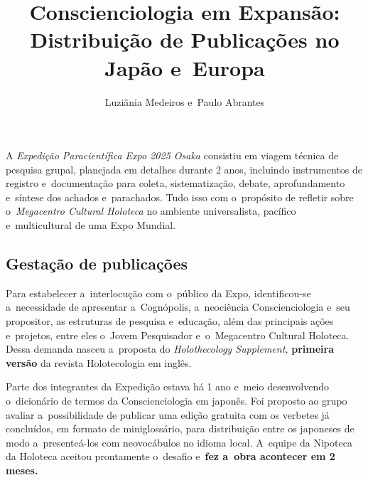 \documentclass{gescons}
\author{Luziânia Medeiros e~Paulo Abrantes}
\title{Conscienciologia em Expansão: Distribuição de Publicações no Japão e~Europa}
\begin{document}
    \makeentrevistatitle


    




A \emph{Expedição Paracientífica Expo 2025 Osaka} consistiu em viagem técnica de pesquisa grupal, planejada em detalhes durante 2 anos, incluindo instrumentos de registro e~documentação para coleta, sistematização, debate, aprofundamento e~síntese dos achados e~parachados. Tudo isso com o~propósito de refletir sobre o~\emph{Megacentro Cultural Holoteca} no ambiente universalista, pacífico e~multicultural de uma Expo Mundial.

\subsection*{Gestação de publicações}

Para estabelecer a~interlocução com o~público da Expo, identificou-se a~necessidade de apresentar a~Cognópolis, a~neociência Conscienciologia e~seu propositor, as estruturas de pesquisa e~educação, além das principais ações e~projetos, entre eles o~Jovem Pesquisador e~o~Megacentro Cultural Holoteca. Dessa demanda nasceu a~proposta do \emph{Holothecology Supplement,} \textbf{primeira versão} da revista Holotecologia em inglês.

Parte dos integrantes da Expedição estava há 1 ano e~meio desenvolvendo o~dicionário de termos da Conscienciologia em japonês. Foi proposto ao grupo avaliar a~possibilidade de publicar uma edição gratuita com os verbetes já concluídos, em formato de miniglossário, para distribuição entre os japoneses de modo a~presenteá-los com neovocábulos no idioma local. A~equipe da Nipoteca da Holoteca aceitou prontamente o~desafio e~\textbf{fez a~obra acontecer em 2 meses.}
\end{document}
